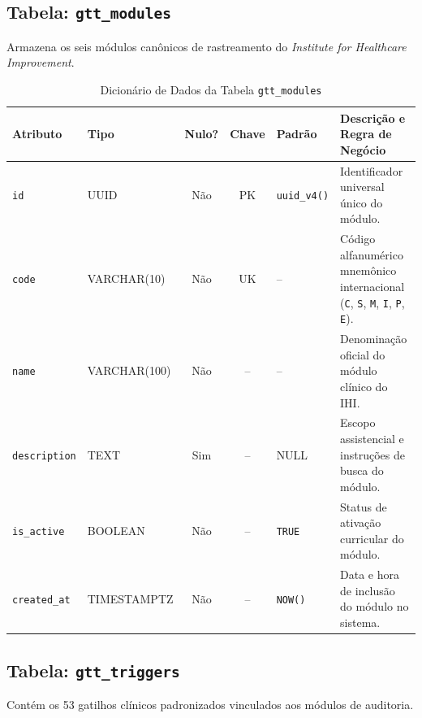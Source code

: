 \subsection{Tabela: \texttt{gtt\_modules}}
Armazena os seis módulos canônicos de rastreamento do \textit{Institute for Healthcare Improvement}.

\begin{table}[!ht]
\centering
\caption{Dicionário de Dados da Tabela \texttt{gtt\_modules}}
\label{tab_dic_gtt_modules}
\footnotesize
\begin{tabularx}{\textwidth}{p{3.2cm} p{2.5cm} c c p{1.8cm} X}
\toprule
\textbf{Atributo} & \textbf{Tipo} & \textbf{Nulo?} & \textbf{Chave} & \textbf{Padrão} & \textbf{Descrição e Regra de Negócio} \\
\midrule
\texttt{id} & UUID & Não & PK & \texttt{uuid\_v4()} & Identificador universal único do módulo. \\
\texttt{code} & VARCHAR(10) & Não & UK & -- & Código alfanumérico mnemônico internacional (\texttt{C}, \texttt{S}, \texttt{M}, \texttt{I}, \texttt{P}, \texttt{E}). \\
\texttt{name} & VARCHAR(100) & Não & -- & -- & Denominação oficial do módulo clínico do IHI. \\
\texttt{description} & TEXT & Sim & -- & NULL & Escopo assistencial e instruções de busca do módulo. \\
\texttt{is\_active} & BOOLEAN & Não & -- & \texttt{TRUE} & Status de ativação curricular do módulo. \\
\texttt{created\_at} & TIMESTAMPTZ & Não & -- & \texttt{NOW()} & Data e hora de inclusão do módulo no sistema. \\
\bottomrule
\end{tabularx}
\end{table}

\subsection{Tabela: \texttt{gtt\_triggers}}
Contém os 53 gatilhos clínicos padronizados vinculados aos módulos de auditoria.

